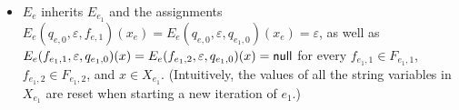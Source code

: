\begin{itemize}
			\item $E_e$ inherits $E_{e_1}$ and the assignments $E_e(q_{e,0},\varepsilon,f_{e,1})(x_e) = E_e(q_{e,0},\varepsilon,q_{e_1,0})(x_e) = \varepsilon$, as well as $E_e(f_{e_1,1},\varepsilon, q_{e_1,0})(x) = E_e(f_{e_1,2},\varepsilon, q_{e_1,0})(x)= \mathsf{null}$ for every $f_{e_1,1} \in F_{e_1,1}$, $f_{e_1,2} \in F_{e_1,2}$, and $x \in X_{e_1}$. (Intuitively, the values of all the string variables in $X_{e_1}$ are reset when starting a new iteration of $e_1$.)
		\end{itemize}

